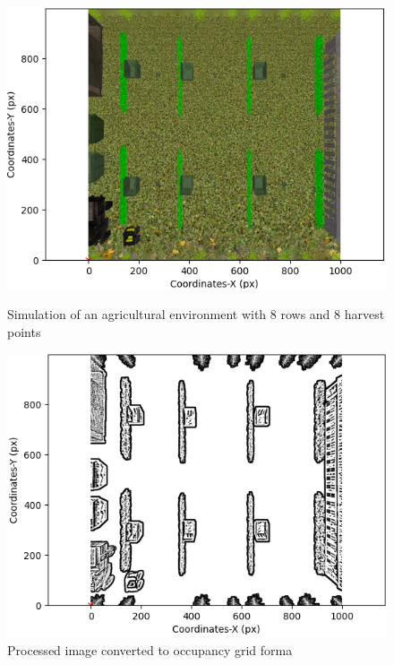 \documentclass[conference]{IEEEtran}
\begin{document}
\begin{figure}[t!]
    \begin{minipage}{0.5\textwidth}
        \centering
        \includegraphics[width=\linewidth]{Images/rgb1.png}
        \caption{Simulation of an agricultural environment with 8 rows and 8 harvest points}
        \label{fig:rgb1}
    \end{minipage}\hfill
    \begin{minipage}{0.5\textwidth}
        \centering
        \includegraphics[width=\linewidth]{Images/occupancy_grid1.png}
        \caption{Processed image converted to occupancy grid forma}
        \label{fig:occupancy_grid1}
    \end{minipage}
\end{figure}
\end{document}
